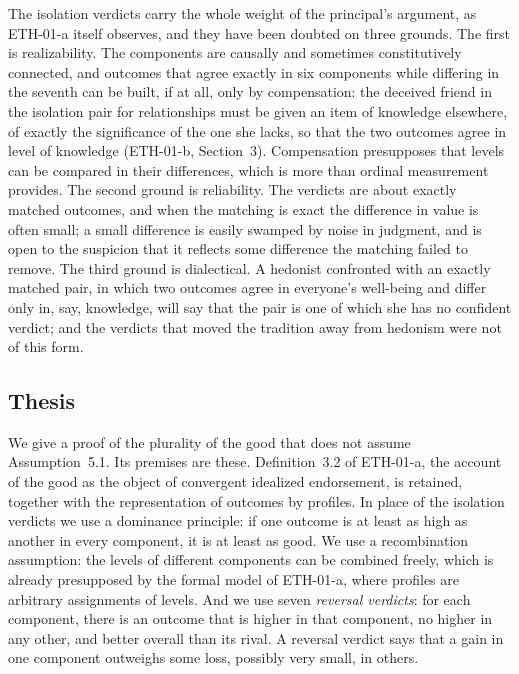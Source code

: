 \documentclass{situationist-preprint}
\begin{document}
The isolation verdicts carry the whole weight of the principal's argument, as ETH-01-a itself observes, and they have been doubted on three grounds. The first is realizability. The components are causally and sometimes constitutively connected, and outcomes that agree exactly in six components while differing in the seventh can be built, if at all, only by compensation: the deceived friend in the isolation pair for relationships must be given an item of knowledge elsewhere, of exactly the significance of the one she lacks, so that the two outcomes agree in level of knowledge (ETH-01-b, Section~3). Compensation presupposes that levels can be compared in their differences, which is more than ordinal measurement provides. The second ground is reliability. The verdicts are about exactly matched outcomes, and when the matching is exact the difference in value is often small; a small difference is easily swamped by noise in judgment, and is open to the suspicion that it reflects some difference the matching failed to remove. The third ground is dialectical. A hedonist confronted with an exactly matched pair, in which two outcomes agree in everyone's well-being and differ only in, say, knowledge, will say that the pair is one of which she has no confident verdict; and the verdicts that moved the tradition away from hedonism were not of this form.

\subsection{Thesis}

We give a proof of the plurality of the good that does not assume Assumption~5.1. Its premises are these. Definition~3.2 of ETH-01-a, the account of the good as the object of convergent idealized endorsement, is retained, together with the representation of outcomes by profiles. In place of the isolation verdicts we use a dominance principle: if one outcome is at least as high as another in every component, it is at least as good. We use a recombination assumption: the levels of different components can be combined freely, which is already presupposed by the formal model of ETH-01-a, where profiles are arbitrary assignments of levels. And we use seven \emph{reversal verdicts}: for each component, there is an outcome that is higher in that component, no higher in any other, and better overall than its rival. A reversal verdict says that a gain in one component outweighs some loss, possibly very small, in others.
\end{document}
